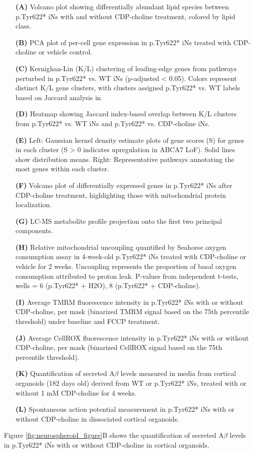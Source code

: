 \begin{itemize}
    \item[\textbf{(A)}] Volcano plot showing differentially abundant lipid species between p.Tyr622* iNs with and without CDP-choline treatment, colored by lipid class. 
    \item[\textbf{(B)}] PCA plot of per-cell gene expression in p.Tyr622* iNs treated with CDP-choline or vehicle control. 
    \item[\textbf{(C)}] Kernighan-Lin (K/L) clustering of leading-edge genes from pathways perturbed in p.Tyr622* vs. WT iNs (p-adjusted < 0.05). Colors represent distinct K/L gene clusters, with clusters assigned p.Tyr622* vs. WT labels based on Jaccard analysis in 
    \item[\textbf{(D)}] Heatmap showing Jaccard index-based overlap between K/L clusters from p.Tyr622* vs. WT iNs and p.Tyr622* vs. CDP-choline iNs. 
    \item[\textbf{(E)}] Left: Gaussian kernel density estimate plots of gene scores (S) for genes in each cluster (S > 0 indicates upregulation in ABCA7 LoF). Solid lines show distribution means. Right: Representative pathways annotating the most genes within each cluster. 
    \item[\textbf{(F)}] Volcano plot of differentially expressed genes in p.Tyr622* iNs after CDP-choline treatment, highlighting those with mitochondrial protein localization. 
    \item[\textbf{(G)}] LC-MS metabolite profile projection onto the first two principal components. 
    \item[\textbf{(H)}] Relative mitochondrial uncoupling quantified by Seahorse oxygen consumption assay in 4-week-old p.Tyr622* iNs treated with CDP-choline or vehicle for 2 weeks. Uncoupling represents the proportion of basal oxygen consumption attributed to proton leak. P-values from independent t-tests, wells = 6 (p.Tyr622* + H2O), 8 (p.Tyr622* + CDP-choline). 
    \item[\textbf{(I)}] Average TMRM fluorescence intensity in p.Tyr622* iNs with or without CDP-choline, per mask (binarized TMRM signal based on the 75th percentile threshold) under baseline and FCCP treatment. 
    \item[\textbf{(J)}] Average CellROX fluorescence intensity in p.Tyr622* iNs with or without CDP-choline, per mask (binarized CellROX signal based on the 75th percentile threshold). 
    \item[\textbf{(K)}] Quantification of secreted A$\beta$ levels measured in media from cortical organoids (182 days old) derived from WT or p.Tyr622* iNs, treated with or without 1 mM CDP-choline for 4 weeks.
    \item[\textbf{(L)}] Spontaneous action potential measurement in p.Tyr622* iNs with or without CDP-choline in dissociated cortical organoids.
\end{itemize}

Figure \ref{fig:neurospheroid_figure}B shows the quantification of secreted A$\beta$ levels in p.Tyr622* iNs with or without CDP-choline in cortical organoids.